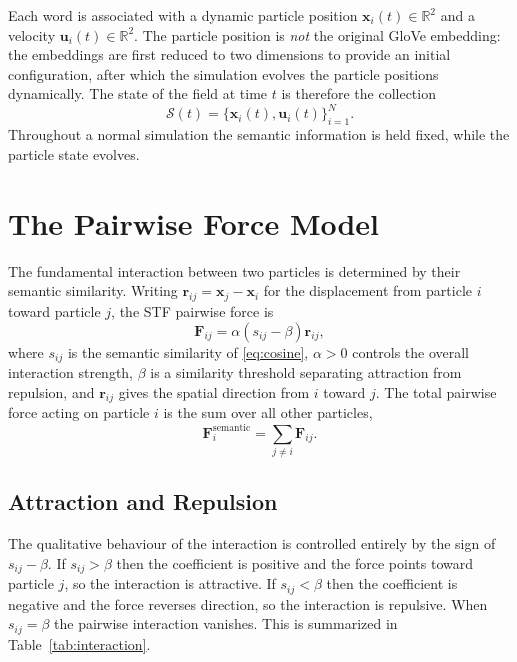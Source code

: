 \documentclass[11pt]{amsart}
\begin{document}
Each word is associated with a dynamic particle position
$\mathbf{x}_i(t) \in \mathbb{R}^2$ and a velocity
$\mathbf{u}_i(t) \in \mathbb{R}^2$. The particle position is \emph{not} the
original GloVe embedding: the embeddings are first reduced to two dimensions to
provide an initial configuration, after which the simulation evolves the
particle positions dynamically. The state of the field at time $t$ is therefore
the collection
\[
\mathcal{S}(t) = \{\mathbf{x}_i(t), \mathbf{u}_i(t)\}_{i=1}^{N}.
\]
Throughout a normal simulation the semantic information is held fixed, while
the particle state evolves.

\section{The Pairwise Force Model}

The fundamental interaction between two particles is determined by their
semantic similarity. Writing $\mathbf{r}_{ij} = \mathbf{x}_j - \mathbf{x}_i$
for the displacement from particle $i$ toward particle $j$, the STF pairwise
force is
\begin{equation}
\label{eq:pairwise-force}
\boxed{
\mathbf{F}_{ij}
=
\alpha \left( s_{ij} - \beta \right) \mathbf{r}_{ij},
}
\end{equation}
where $s_{ij}$ is the semantic similarity of \eqref{eq:cosine}, $\alpha > 0$
controls the overall interaction strength, $\beta$ is a similarity threshold
separating attraction from repulsion, and $\mathbf{r}_{ij}$ gives the spatial
direction from $i$ toward $j$. The total pairwise force acting on particle $i$
is the sum over all other particles,
\begin{equation}
\label{eq:total-semantic}
\mathbf{F}_i^{\mathrm{semantic}}
=
\sum_{j \neq i} \mathbf{F}_{ij}.
\end{equation}

\subsection{Attraction and Repulsion}

The qualitative behaviour of the interaction is controlled entirely by the sign
of $s_{ij} - \beta$. If $s_{ij} > \beta$ then the coefficient is positive and
the force points toward particle $j$, so the interaction is attractive. If
$s_{ij} < \beta$ then the coefficient is negative and the force reverses
direction, so the interaction is repulsive. When $s_{ij} = \beta$ the pairwise
interaction vanishes. This is summarized in Table~\ref{tab:interaction}.
\end{document}
